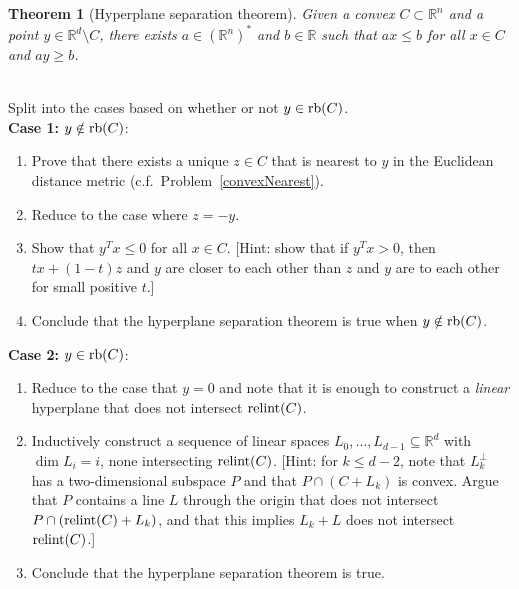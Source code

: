 \documentclass[letterpaper,11pt]{amsart}
\theoremstyle{plain}
\newtheorem*{thm*}{Theorem}
\theoremstyle{definition}
\theoremstyle{remark}
\newcommand{\rb}{{\rm rb}}
\newcommand{\ri}{{\rm relint}}
\begin{document}
\begin{thm*}[Hyperplane separation theorem]
    Given a convex $C\subset \mathbb{R}^n$ and a point $y \in \mathbb{R}^d\setminus C$,
    there exists $a \in (\mathbb{R}^n)^*$ and $b \in \mathbb{R}$ such that $ax \le b$ for all $x \in C$ and $ay \ge b$.
\end{thm*}
\\
    Split into the cases based on whether or not $y \in \rb(C)$.\\
    {\bf Case 1:} $y \notin \rb(C)$:
    \begin{enumerate}
        \item Prove that there exists a unique $z \in C$ that is nearest
        to $y$ in the Euclidean distance metric (c.f.~Problem~\ref{convexNearest}).
        \item Reduce to the case where $z = -y$.
        \item Show that $y^Tx \le 0$ for all $x \in C$. [Hint: show that if $y^Tx > 0$,
        then $tx + (1-t)z$ and $y$ are closer to each other than $z$ and $y$ are to each other for small positive $t$.]
        \item Conclude that the hyperplane separation theorem is true when $y \notin \rb(C)$.
    \end{enumerate}
    {\bf Case 2:} $y \in \rb(C)$:
    \begin{enumerate}
        \item Reduce to the case that $y = 0$ and note that it is enough to construct a \emph{linear} hyperplane
        that does not intersect $\ri(C)$.
        \item Inductively construct a sequence of linear spaces $L_0,\dots,L_{d-1} \subseteq \mathbb{R}^d$ with $\dim L_i = i$,
        none intersecting $\ri(C)$. [Hint: for $k \le d-2$, note that $L_k^\perp$ has a two-dimensional subspace $P$
        and that $P \cap (C + L_k)$ is convex.
        Argue that $P$ contains a line $L$ through the origin that does not intersect $P \cap (\ri(C) + L_k)$, and that this implies $L_k + L$ does not intersect $\ri(C)$.]
        \item Conclude that the hyperplane separation theorem is true.
    \end{enumerate}
\end{document}
